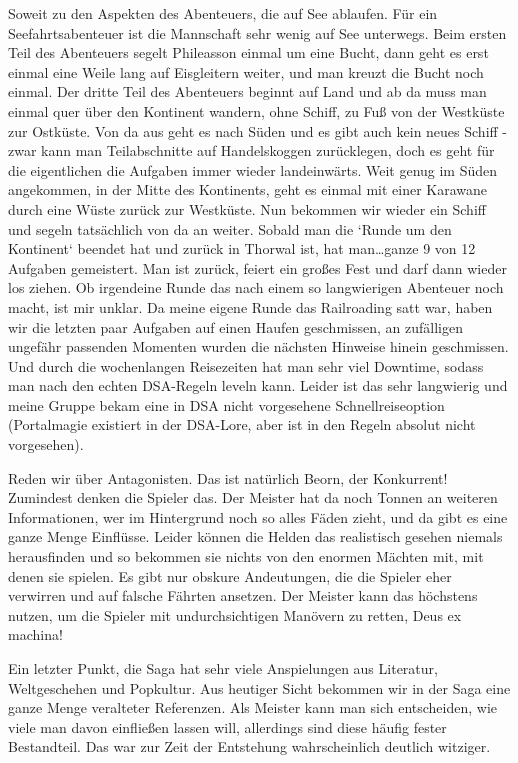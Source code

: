 \documentclass[final]{multiversum}
\begin{document}
Soweit zu den Aspekten des Abenteuers, die auf See ablaufen. Für ein
Seefahrtsabenteuer ist die Mannschaft sehr wenig auf See unterwegs. Beim ersten
Teil des Abenteuers segelt Phileasson einmal um eine Bucht, dann geht es erst
einmal eine Weile lang auf Eisgleitern weiter, und man kreuzt die Bucht noch
einmal. Der dritte Teil des Abenteuers beginnt auf Land und ab da muss man
einmal quer über den Kontinent wandern, ohne Schiff, zu Fuß von der Westküste
zur Ostküste. Von da aus geht es nach Süden und es gibt auch kein neues Schiff -
zwar kann man Teilabschnitte auf Handelskoggen zurücklegen, doch es geht für die
eigentlichen die Aufgaben immer wieder landeinwärts. Weit genug im Süden
angekommen, in der Mitte des Kontinents, geht es einmal mit einer Karawane durch
eine Wüste zurück zur Westküste. Nun bekommen wir wieder ein Schiff und segeln
tatsächlich von da an weiter. Sobald man die `Runde um den Kontinent` beendet hat
und zurück in Thorwal ist, hat man\dots  ganze 9 von 12 Aufgaben gemeistert. Man ist
zurück, feiert ein großes Fest und darf dann wieder los ziehen. Ob irgendeine
Runde das nach einem so langwierigen Abenteuer noch macht, ist mir unklar. Da
meine eigene Runde das Railroading satt war, haben wir die letzten paar Aufgaben
auf einen Haufen geschmissen, an zufälligen ungefähr passenden Momenten wurden
die nächsten Hinweise hinein geschmissen. Und durch die wochenlangen Reisezeiten
hat man sehr viel Downtime, sodass man nach den echten DSA-Regeln leveln kann.
Leider ist das sehr langwierig und meine Gruppe bekam eine in DSA nicht
vorgesehene Schnellreiseoption (Portalmagie existiert in der DSA-Lore, aber ist
in den Regeln absolut nicht vorgesehen).

Reden wir über Antagonisten. Das ist natürlich Beorn, der Konkurrent! Zumindest
denken die Spieler das. Der Meister hat da noch Tonnen an weiteren
Informationen, wer im Hintergrund noch so alles Fäden zieht, und da gibt es eine
ganze Menge Einflüsse. Leider können die Helden das realistisch gesehen niemals
herausfinden und so bekommen sie nichts von den enormen Mächten mit, mit denen
sie spielen. Es gibt nur obskure Andeutungen, die die Spieler eher verwirren und
auf falsche Fährten ansetzen. Der Meister kann das höchstens nutzen, um die
Spieler mit undurchsichtigen Manövern zu retten, Deus ex machina!

Ein letzter Punkt, die Saga hat sehr viele Anspielungen aus Literatur,
Weltgeschehen und Popkultur. Aus heutiger Sicht bekommen wir in der Saga eine
ganze Menge veralteter Referenzen. Als Meister kann man sich entscheiden, wie
viele man davon einfließen lassen will, allerdings sind diese häufig fester
Bestandteil. Das war zur Zeit der Entstehung wahrscheinlich deutlich witziger.
\end{document}
